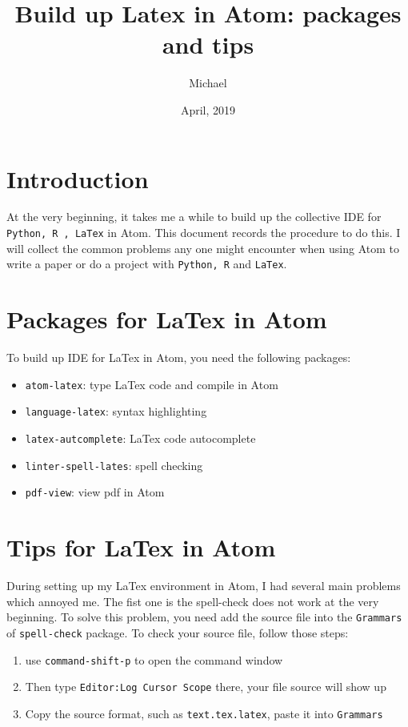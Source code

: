 \documentclass[12pt]{article}
\theoremstyle{definition}
\begin{document}
\title{Build up Latex in Atom: packages and tips }
\author{Michael}
\date{April, 2019}


\maketitle  %


\section{Introduction}

At the very beginning, it takes me a while to build up the collective IDE for \texttt{Python, R , LaTex} in Atom. This document records the procedure to do this. I will collect the common problems any one might encounter when using Atom to write a paper or do a project with \texttt{Python, R} and \texttt{LaTex}.


\section{Packages for LaTex in Atom}

To build up IDE for LaTex in Atom, you need the following packages:
\begin{itemize}
  \item \texttt{atom-latex}: type LaTex code and compile in Atom
  \item \texttt{language-latex}: syntax highlighting
  \item \texttt{latex-autcomplete}: LaTex code autocomplete
  \item \texttt{linter-spell-lates}: spell checking
  \item \texttt{pdf-view}: view pdf in Atom
\end{itemize}

\section{Tips for LaTex in Atom}

During setting up my LaTex environment in Atom, I had several main problems which annoyed me. The fist one is the spell-check does not work at the very beginning. To solve this problem, you need add the source file into the \texttt{Grammars} of \texttt{spell-check} package. To check your source file, follow those steps:
\begin{enumerate}
  \item use \colorbox{cmd}{\texttt{command-shift-p}} to open the command window
  \item Then type \colorbox{cmd}{\texttt{Editor:Log Cursor Scope}} there, your file source will show up
  \item Copy the source format, such as \colorbox{cmd}{\texttt{text.tex.latex}}, paste it into \colorbox{cmd}{\texttt{Grammars}}
\end{enumerate}
\end{document}
